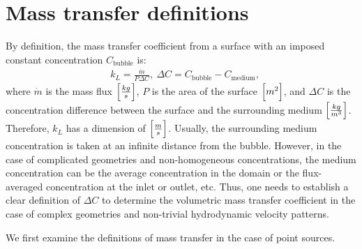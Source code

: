 \documentclass[preprint,12pt]{elsarticle}
\newcommand{\beqal}{\begin{equation}\begin{aligned}}
\newcommand{\feqal}{\end{aligned}\end{equation}}
\newcommand{\cbubble}{C_{\mathrm{bubble}}}
\newcommand{\cmedium}{C_{\mathrm{medium}}}
\begin{document}
\section{Mass transfer definitions}
By definition, the mass transfer coefficient from a surface with an imposed constant
concentration $\cbubble$ is:
\beqal
\label{eq:main:definition}
&k_L=\frac{\dot{m}}{P \Delta C},\ \Delta C= \cbubble - \cmedium,
\feqal
where $\dot{m}$ is the mass flux $\Bigl[\frac{kg}{s}\Bigr]$, $P$ is the area of the surface
$\Bigl[m^2\Bigr]$, and $\Delta C$ is the concentration difference between the surface and the surrounding medium
$\Bigl[\frac{kg}{m^3}\Bigr]$. Therefore, $k_L$ has a dimension of 
$\Bigl[\frac{m}{s}\Bigr]$. Usually, the surrounding medium concentration is taken at an infinite distance
from the bubble. However, in the case of complicated geometries and non-homogeneous concentrations, 
the medium concentration can be the average concentration in the domain or the flux-averaged
concentration at the inlet or outlet, etc. Thus, one needs to establish a clear definition of  $\Delta C$ to determine the volumetric
mass transfer coefficient in the case of complex geometries and non-trivial hydrodynamic velocity patterns.

We first examine the
 definitions of mass transfer in the case of point  sources.
\end{document}
